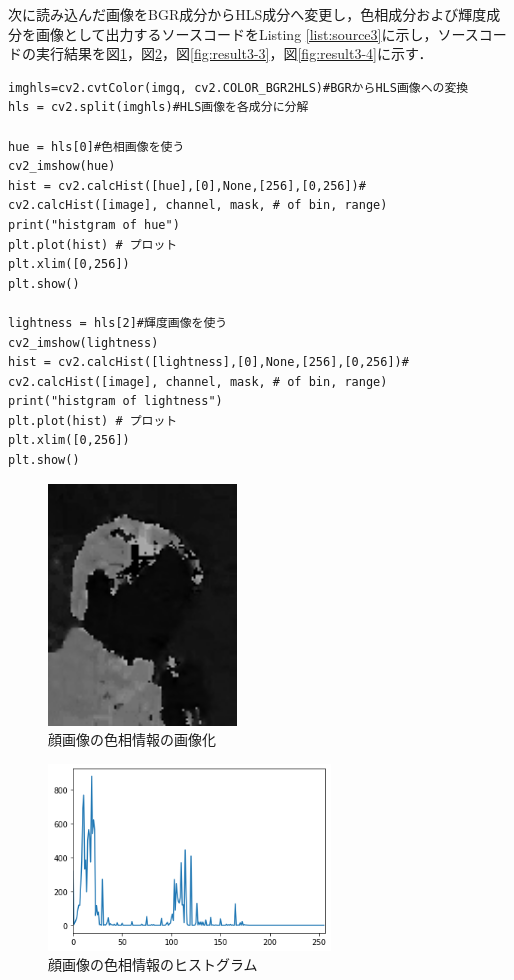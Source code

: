 \documentclass[uplatex]{jsarticle}
\begin{document}
次に読み込んだ画像をBGR成分からHLS成分へ変更し，色相成分および輝度成分を画像として出力するソースコードをListing \ref{list:source3}に示し，ソースコードの実行結果を図\ref{fig:result3-1}，図\ref{fig:result3-2}，図\ref{fig:result3-3}，図\ref{fig:result3-4}に示す．
\begin{lstlisting}[caption=画像のHLSへの変換,label=list:source3]
imghls=cv2.cvtColor(imgq, cv2.COLOR_BGR2HLS)#BGRからHLS画像への変換
hls = cv2.split(imghls)#HLS画像を各成分に分解

hue = hls[0]#色相画像を使う
cv2_imshow(hue)
hist = cv2.calcHist([hue],[0],None,[256],[0,256])#　cv2.calcHist([image], channel, mask, # of bin, range)
print("histgram of hue")
plt.plot(hist) # プロット
plt.xlim([0,256])
plt.show()

lightness = hls[2]#輝度画像を使う
cv2_imshow(lightness)
hist = cv2.calcHist([lightness],[0],None,[256],[0,256])#　cv2.calcHist([image], channel, mask, # of bin, range)
print("histgram of lightness")
plt.plot(hist) # プロット
plt.xlim([0,256])
plt.show()
\end{lstlisting}

\begin{figure}[htbp]
  \begin{center}
    \includegraphics[clip,width=5.0cm]{figures/result3-1.png}
    \caption{顔画像の色相情報の画像化}
    \label{fig:result3-1}
  \end{center}
\end{figure}

\begin{figure}[htbp]
  \begin{center}
    \includegraphics[clip,width=7.5cm]{figures/result3-2.png}
    \caption{顔画像の色相情報のヒストグラム}
    \label{fig:result3-2}
  \end{center}
\end{figure}
\end{document}
